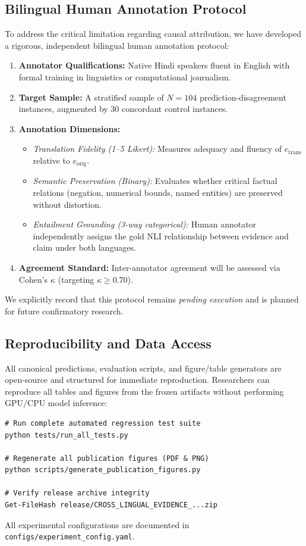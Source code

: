 \subsection{Bilingual Human Annotation Protocol}
\label{sec:app_human_protocol}
To address the critical limitation regarding causal attribution, we have developed a rigorous, independent bilingual human annotation protocol:
\begin{enumerate}
    \item \textbf{Annotator Qualifications:} Native Hindi speakers fluent in English with formal training in linguistics or computational journalism.
    \item \textbf{Target Sample:} A stratified sample of $N=104$ prediction-disagreement instances, augmented by 30 concordant control instances.
    \item \textbf{Annotation Dimensions:}
    \begin{itemize}
        \item \emph{Translation Fidelity (1--5 Likert):} Measures adequacy and fluency of $e_{\text{trans}}$ relative to $e_{\text{orig}}$.
        \item \emph{Semantic Preservation (Binary):} Evaluates whether critical factual relations (negation, numerical bounds, named entities) are preserved without distortion.
        \item \emph{Entailment Grounding (3-way categorical):} Human annotator independently assigns the gold NLI relationship between evidence and claim under both languages.
    \end{itemize}
    \item \textbf{Agreement Standard:} Inter-annotator agreement will be assessed via Cohen's $\kappa$ (targeting $\kappa \ge 0.70$).
\end{enumerate}
We explicitly record that this protocol remains \emph{pending execution} and is planned for future confirmatory research.

\subsection{Reproducibility and Data Access}
\label{sec:app_reproducibility}
All canonical predictions, evaluation scripts, and figure/table generators are open-source and structured for immediate reproduction. Researchers can reproduce all tables and figures from the frozen artifacts without performing GPU/CPU model inference:
\begin{verbatim}
# Run complete automated regression test suite
python tests/run_all_tests.py

# Regenerate all publication figures (PDF & PNG)
python scripts/generate_publication_figures.py

# Verify release archive integrity
Get-FileHash release/CROSS_LINGUAL_EVIDENCE_...zip
\end{verbatim}
All experimental configurations are documented in \texttt{configs/experiment\_config.yaml}.
